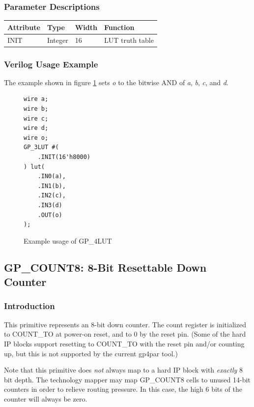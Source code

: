 \documentclass{article}
\begin{document}
\subsubsection{Parameter Descriptions}

\begin{tabularx}{4in}{|l|l|l|X|}
\hline
{\bfseries Attribute} & {\bfseries Type} & {\bfseries Width} & {\bfseries Function} \\
\hline
INIT & Integer & 16 & LUT truth table \\
\hline
\end{tabularx}

\subsubsection{Verilog Usage Example}

The example shown in figure \ref{gp-4LUT-example} sets \emph{o} to the bitwise AND of \emph{a}, \emph{b}, \emph{c},
and \emph{d}.

\begin{figure}[h]
\begin{lstlisting}
wire a;
wire b;
wire c;
wire d;
wire o;
GP_3LUT #(
	.INIT(16'h8000)
) lut(
	.IN0(a),
	.IN1(b),
	.IN2(c),
	.IN3(d)
	.OUT(o)
);
\end{lstlisting}
\caption{Example usage of GP\_4LUT}
\label{gp-4LUT-example}
\end{figure}


\pagebreak
\subsection{GP\_COUNT8: 8-Bit Resettable Down Counter}

\subsubsection{Introduction}
This primitive represents an 8-bit down counter. The count register is initialized to COUNT\_TO at power-on reset, and 
to 0 by the reset pin. (Some of the hard IP blocks support resetting to COUNT\_TO with the reset pin and/or counting 
up, but this is not supported by the current gp4par tool.)

Note that this primitive does \emph{not} always map to a hard IP block with \emph{exactly} 8 bit depth. The technology 
mapper may map GP\_COUNT8 cells to unused 14-bit counters in order to relieve routing pressure. In this case, the high 
6 bits of the counter will always be zero.
\end{document}
